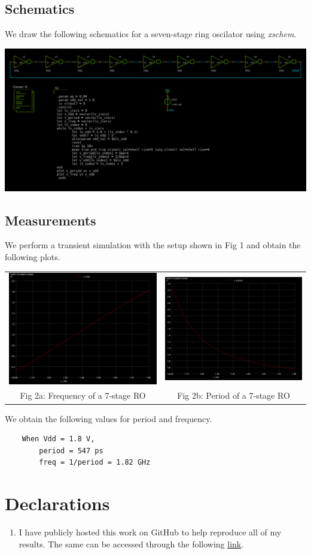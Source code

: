 \documentclass[12pt,a4paper]{article}
\begin{document}
\subsection{Schematics}
\noindent We draw the following schematics for a seven-stage ring oscilator using \emph{xschem}.
\begin{center}
\includegraphics[width=0.99\linewidth]{tut4/expt2/ro9.sch.png}
\end{center}

\subsection{Measurements}
\noindent We perform a transient simulation with the setup shown in Fig 1 and obtain the following plots.
\begin{center}
\begin{tabular}{cc}
     \includegraphics[width=0.47\linewidth]{tut4/reports/media/expt2_freq.png} &
     \includegraphics[width=0.47\linewidth]{tut4/reports/media/expt2_prd.png} \\
     Fig 2a: Frequency of a 7-stage RO & Fig 2b: Period of a 7-stage RO
\end{tabular}
\end{center}
\noindent We obtain the following values for period and frequency.
\begin{verbatim}
    When Vdd = 1.8 V,
        period = 547 ps
        freq = 1/period = 1.82 GHz
\end{verbatim}

\section{Declarations}
\begin{enumerate}
    \item I have publicly hosted this work on GitHub to help reproduce all of my results. The same can be accessed through the following \href{https://github.com/iamkarthikbk/ee5311-2025}{\underline{link}}.
\end{enumerate}
\end{document}
